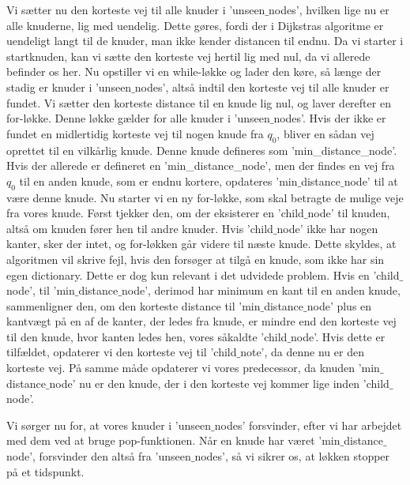 Vi sætter nu den korteste vej til alle knuder i 'unseen$\_$nodes', hvilken lige nu er alle knuderne, lig med uendelig. Dette gøres, fordi der i Dijkstras algoritme er uendeligt langt til de knuder, man ikke kender distancen til endnu. Da vi starter i startknuden, kan vi sætte den korteste vej hertil lig med nul, da vi allerede befinder os her.
Nu opstiller vi en while-løkke og lader den køre, så længe der stadig er knuder i 'unseen$\_$nodes', altså indtil den korteste vej til alle knuder er fundet.
Vi sætter den korteste distance til en knude lig nul, og laver derefter en for-løkke. Denne løkke gælder for alle knuder i 'unseen$\_$nodes'. Hvis der ikke er fundet en midlertidig korteste vej til nogen knude fra $q_0$, bliver en sådan vej oprettet til en vilkårlig knude. Denne knude defineres som 'min\_distance\_node'. Hvis der allerede er defineret en 'min\_distance\_node', men der findes en vej fra $q_0$ til en anden knude, som er endnu kortere, opdateres 'min$\_$distance$\_$node' til at være denne knude.
Nu starter vi en ny for-løkke, som skal betragte de mulige veje fra vores knude.
Først tjekker den, om der eksisterer en 'child$\_$node' til knuden, altså om knuden fører hen til andre knuder. Hvis 'child$\_$node' ikke har nogen kanter, sker der intet, og for-løkken går videre til næste knude. Dette skyldes, at algoritmen vil skrive fejl, hvis den forsøger at tilgå en knude, som ikke har sin egen dictionary. Dette er dog kun relevant i det udvidede problem.
Hvis en 'child$\_$node', til  'min$\_$distance$\_$node', derimod har minimum en kant til en anden knude, sammenligner den, om den korteste distance til 'min$\_$distance$\_$node' plus en kantvægt på en af de kanter, der ledes fra knude, er mindre end den korteste vej til den knude, hvor kanten ledes hen, vores såkaldte 'child$\_$node'. Hvis dette er tilfældet, opdaterer vi den korteste vej til 'child$\_$note', da denne nu er den korteste vej. På samme måde opdaterer vi vores predecessor, da knuden 'min$\_$distance$\_$node' nu er den knude, der i den korteste vej kommer lige inden 'child$\_$node'.

Vi sørger nu for, at vores knuder i 'unseen$\_$nodes' forsvinder, efter vi har arbejdet med dem ved at bruge pop-funktionen. Når en knude har været 'min$\_$distance$\_$node', forsvinder den altså fra 'unseen$\_$nodes', så vi sikrer os, at løkken stopper på et tidspunkt. 

